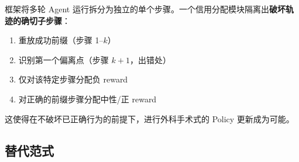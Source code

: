 \begin{keybox}[多轮轨迹切片]
框架将多轮 Agent 运行拆分为独立的单个步骤。一个信用分配模块隔离出\textbf{破坏轨迹的确切子步骤}：

\begin{enumerate}
  \item 重放成功前缀（步骤 1--$k$）
  \item 识别第一个偏离点（步骤 $k+1$，出错处）
  \item 仅对该特定步骤分配负 reward
  \item 对正确的前缀步骤分配中性/正 reward
\end{enumerate}

这使得在不破坏已正确行为的前提下，进行外科手术式的 Policy 更新成为可能。
\end{keybox}

\subsection{替代范式}
\label{alternative-paradigms}

